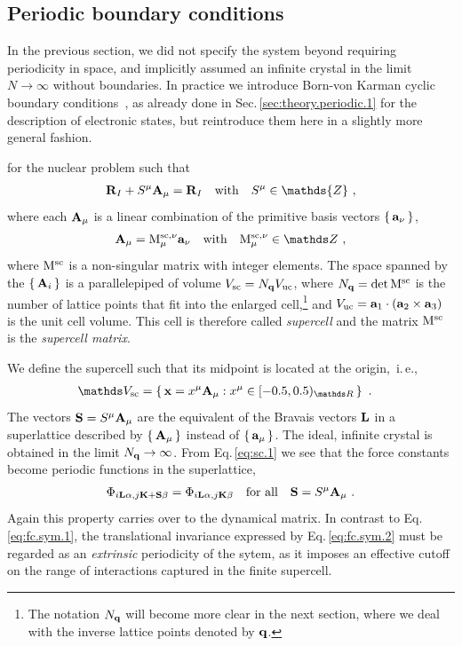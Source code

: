 \subsection{Periodic boundary conditions}
In the previous section, we did not specify the system beyond requiring periodicity in space, and implicitly assumed an infinite crystal in the limit $N \to \infty$ without boundaries. In practice we introduce Born-von Karman cyclic boundary conditions~\cite{born2013atomtheorie}, as already done in Sec.\,\ref{sec:theory.periodic.1} for the description of electronic states, but reintroduce them here in a slightly more general fashion.

 for the nuclear problem such that
\begin{align}
\b R_I + S^\mu \b A_\mu = \b R_I \quad\text{with}\quad S^\mu \in \mathds{Z}~,
\label{eq:sc.1}
\end{align}
where each ${\bf A}_\mu$ is a linear combination of the primitive basis vectors $\set{{\bf a}_\nu}$,
\begin{align}
{\bf A}_\mu = {\rm M}_{\mu}^{{\rm sc}, \nu} {\bf a}_\nu\quad\text{with}\quad {\rm M}_{\mu}^{{\rm sc}, \nu} \in \mathds Z~,
\end{align}
where $\rm M^{\rm sc}$ is a non-singular matrix with integer elements. The space spanned by the $\set{{\bf A}_i}$ is a parallelepiped of volume $V_{\rm sc} = N_{\bf q} V_{\rm uc}$, where $N_{\bf q} = \det {\rm M}^{\rm sc}$ is the number of lattice points that fit into the enlarged cell,\footnote{The notation $N_{\bf q}$ will become more clear in the next section, where we deal with the inverse lattice points denoted by $\bf q$.} and $V_{\rm uc} = {\bf a}_1 \cdot ({\bf a}_2 \times {\bf a}_3)$ is the unit cell volume. This cell is therefore called \emph{supercell} and the matrix ${\rm M}^{\rm sc}$ is the \emph{supercell matrix}.

We define the supercell such that its midpoint is located at the origin,~i.\,e.,~
\begin{align}
\mathds V_{\rm sc}
&= \set{{\bf x} = x^\mu {\bf A}_\mu : x^\mu \in {[-0.5, 0.5)_{\mathds R}}}~.
\label{eq:supercell}
\end{align}
The vectors \mbox{${\bf S} = S^\mu {\bf A}_\mu$} are the equivalent of the Bravais vectors ${\bf L}$ in a superlattice described by $\set{ {\bf A}_\mu }$ instead of $\set{ {\bf a}_\mu}$.
The ideal, infinite crystal is obtained in the limit $N_{\bf q} \rightarrow \infty$.
From Eq.\,\eqref{eq:sc.1} we see that the force constants become periodic functions in the superlattice,
\begin{align}
\Phi_{i {\bf L} \alpha, j {\bf K} + \b S \beta} 
= \Phi_{i {\bf L} \alpha, j {\bf K} \beta} \quad\text{for all}\quad \b S = S^\mu \b A_\mu~.
\label{eq:fc.sym.2}
\end{align}
Again this property carries over to the dynamical matrix. In contrast to Eq.\,\eqref{eq:fc.sym.1}, the translational invariance expressed by Eq.\,\eqref{eq:fc.sym.2} must be regarded as an \emph{extrinsic} periodicity of the sytem, as it imposes an effective cutoff on the range of interactions captured in the finite supercell.

